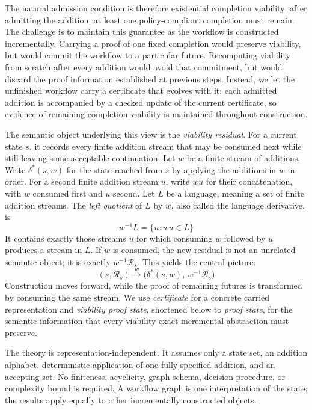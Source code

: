 \documentclass[11pt]{article}
\theoremstyle{definition}
\newcommand{\Run}{\delta^{*}}
\newcommand{\Residual}{\mathcal R}
\begin{document}
The natural admission condition is therefore existential completion viability: after admitting the addition, at least one policy-compliant completion must remain.\newline
The challenge is to maintain this guarantee as the workflow is constructed incrementally. Carrying a proof of one fixed completion would preserve viability, but would commit the workflow to a particular future. Recomputing viability from scratch after every addition would avoid that commitment, but would discard the proof information established at previous steps. Instead, we let the unfinished workflow carry a certificate that evolves with it: each admitted addition is accompanied by a checked update of the current certificate, so evidence of remaining completion viability is maintained throughout construction.

The semantic object underlying this view is the \emph{viability residual}. For a current state $s$, it records every finite addition stream that may be consumed next while still leaving some acceptable continuation. Let $w$ be a finite stream of additions. Write $\Run(s,w)$ for the state reached from $s$ by applying the additions in $w$ in order. For a second finite addition stream $u$, write $wu$ for their concatenation, with $w$ consumed first and $u$ second. Let $L$ be a language, meaning a set of finite addition streams. The \emph{left quotient} of $L$ by $w$, also called the language derivative, is
\[
  w^{-1}L=\{u:wu\in L\}
\]
It contains exactly those streams $u$ for which consuming $w$ followed by $u$ produces a stream in $L$. If $w$ is consumed, the new residual is not an unrelated semantic object; it is exactly $w^{-1}\Residual_s$. This yields the central picture:
\begin{equation}\label{eq:central-picture}
 (s,\Residual_s)
   \xrightarrow{\;w\;}
 \bigl(\Run(s,w),\,w^{-1}\Residual_s\bigr)
\end{equation}
Construction moves forward, while the proof of remaining futures is transformed by consuming the same stream.
We use \emph{certificate} for a concrete carried representation and \emph{viability proof state}, shortened below to \emph{proof state}, for the semantic information that every viability-exact incremental abstraction must preserve.

The theory is representation-independent. It assumes only a state set, an addition alphabet, deterministic application of one fully specified addition, and an accepting set. No finiteness, acyclicity, graph schema, decision procedure, or complexity bound is required. A workflow graph is one interpretation of the state; the results apply equally to other incrementally constructed objects.
\end{document}
